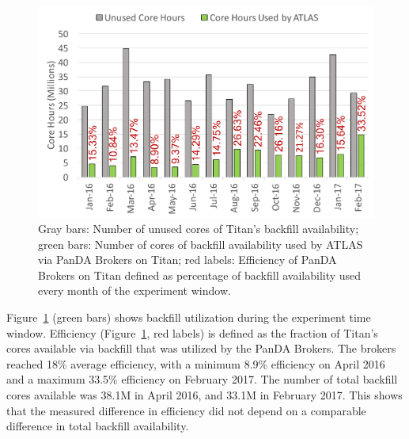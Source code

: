 \begin{figure}[htp]
    \includegraphics[clip,width=\columnwidth]{figures/backfill_consumption.pdf}
    \caption{Gray bars: Number of unused cores of Titan's backfill availability;
    green bars: Number of cores of backfill availability used by ATLAS via PanDA
    Brokers on Titan; red labels: Efficiency of PanDA Brokers on Titan defined
    as percentage of backfill availability used every month of the experiment
    window.}
\label{fig:backfill-utilization}
\end{figure}

Figure~\ref{fig:backfill-utilization} (green bars) shows backfill utilization
during the experiment time window. Efficiency
(Figure~\ref{fig:backfill-utilization}, red labels) is defined as the fraction
of Titan’s cores available via backfill that was utilized by the PanDA Brokers.
The brokers reached 18\% average efficiency, with a minimum 8.9\% efficiency on
April 2016 and a maximum 33.5\% efficiency on February 2017. The number of total
backfill cores available was 38.1M in April 2016, and 33.1M in February 2017.
This shows that the measured difference in efficiency did not depend on a
comparable difference in total backfill availability.

 


